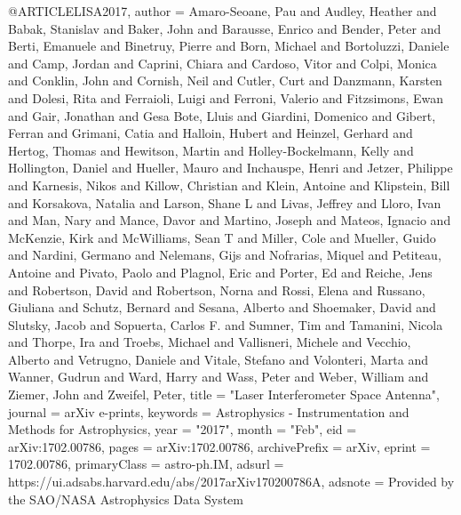\documentclass[twocolumn,tighten]{aastex63}
\begin{document}
@ARTICLE{LISA2017,
       author = {{Amaro-Seoane}, Pau and {Audley}, Heather and {Babak}, Stanislav and
         {Baker}, John and {Barausse}, Enrico and {Bender}, Peter and
         {Berti}, Emanuele and {Binetruy}, Pierre and {Born}, Michael and
         {Bortoluzzi}, Daniele and {Camp}, Jordan and {Caprini}, Chiara and
         {Cardoso}, Vitor and {Colpi}, Monica and {Conklin}, John and
         {Cornish}, Neil and {Cutler}, Curt and {Danzmann}, Karsten and
         {Dolesi}, Rita and {Ferraioli}, Luigi and {Ferroni}, Valerio and
         {Fitzsimons}, Ewan and {Gair}, Jonathan and {Gesa Bote}, Lluis and
         {Giardini}, Domenico and {Gibert}, Ferran and {Grimani}, Catia and
         {Halloin}, Hubert and {Heinzel}, Gerhard and {Hertog}, Thomas and
         {Hewitson}, Martin and {Holley-Bockelmann}, Kelly and
         {Hollington}, Daniel and {Hueller}, Mauro and {Inchauspe}, Henri and
         {Jetzer}, Philippe and {Karnesis}, Nikos and {Killow}, Christian and
         {Klein}, Antoine and {Klipstein}, Bill and {Korsakova}, Natalia and
         {Larson}, Shane L and {Livas}, Jeffrey and {Lloro}, Ivan and
         {Man}, Nary and {Mance}, Davor and {Martino}, Joseph and
         {Mateos}, Ignacio and {McKenzie}, Kirk and {McWilliams}, Sean T and
         {Miller}, Cole and {Mueller}, Guido and {Nardini}, Germano and
         {Nelemans}, Gijs and {Nofrarias}, Miquel and {Petiteau}, Antoine and
         {Pivato}, Paolo and {Plagnol}, Eric and {Porter}, Ed and
         {Reiche}, Jens and {Robertson}, David and {Robertson}, Norna and
         {Rossi}, Elena and {Russano}, Giuliana and {Schutz}, Bernard and
         {Sesana}, Alberto and {Shoemaker}, David and {Slutsky}, Jacob and
         {Sopuerta}, Carlos F. and {Sumner}, Tim and {Tamanini}, Nicola and
         {Thorpe}, Ira and {Troebs}, Michael and {Vallisneri}, Michele and
         {Vecchio}, Alberto and {Vetrugno}, Daniele and {Vitale}, Stefano and
         {Volonteri}, Marta and {Wanner}, Gudrun and {Ward}, Harry and
         {Wass}, Peter and {Weber}, William and {Ziemer}, John and
         {Zweifel}, Peter},
        title = "{Laser Interferometer Space Antenna}",
      journal = {arXiv e-prints},
     keywords = {Astrophysics - Instrumentation and Methods for Astrophysics},
         year = "2017",
        month = "Feb",
          eid = {arXiv:1702.00786},
        pages = {arXiv:1702.00786},
archivePrefix = {arXiv},
       eprint = {1702.00786},
 primaryClass = {astro-ph.IM},
       adsurl = {https://ui.adsabs.harvard.edu/abs/2017arXiv170200786A},
      adsnote = {Provided by the SAO/NASA Astrophysics Data System}
}
\end{document}
